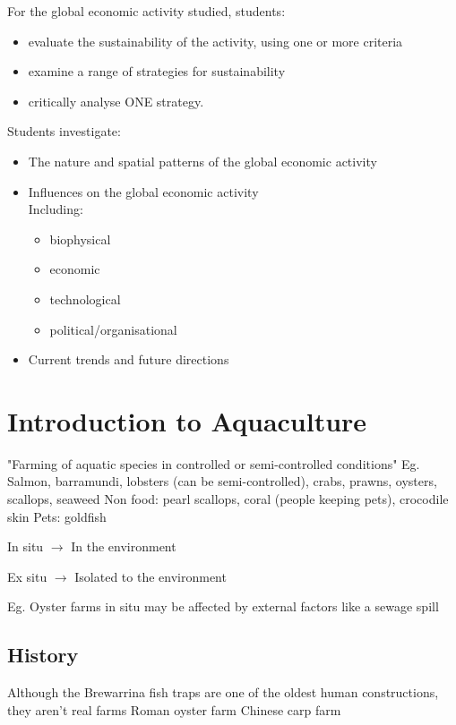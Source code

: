 	For the global economic activity studied, students:
	\begin{itemize}
		\item evaluate the sustainability of the activity, using one or more criteria
		\item examine a range of strategies for sustainability
		\item critically analyse ONE strategy.
	\end{itemize}
	Students investigate:
	\begin{itemize}
		\item The nature and spatial patterns of the global economic activity
		\item Influences on the global economic activity \\ Including:
		\begin{itemize}
			\item biophysical
			\item economic
			\item technological
			\item political/organisational
		\end{itemize}
		\item Current trends and future directions
	\end{itemize}

\newpage

\section{Introduction to Aquaculture} \label{1/11/2024}
	"Farming of aquatic species in controlled or semi-controlled conditions"
		Eg. Salmon, barramundi, lobsters (can be semi-controlled), crabs, prawns, oysters, scallops, seaweed
		Non food: pearl scallops, coral (people keeping pets), crocodile skin
		Pets: goldfish

	In situ $\rightarrow$ In the environment

	Ex situ $\rightarrow$ Isolated to the environment

	Eg. Oyster farms in situ may be affected by external factors like a sewage spill

	\subsection{History}
		Although the Brewarrina fish traps are one of the oldest human constructions, they aren't real farms
		Roman oyster farm
		Chinese carp farm

